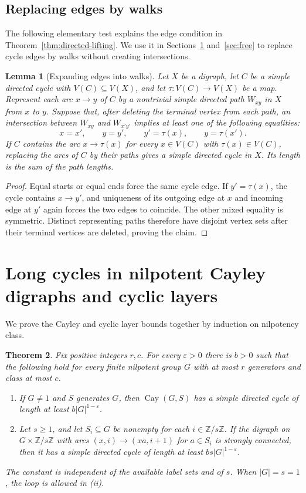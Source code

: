 \documentclass[11pt,a4paper,reqno]{amsart}
\newtheorem{theorem}{Theorem}[section]
\newtheorem{lemma}[theorem]{Lemma}
\theoremstyle{definition}
\theoremstyle{remark}
\numberwithin{equation}{section}
\DeclareMathOperator{\Cay}{Cay}
\newcommand{\Z}{\mathbb Z}
\newcommand{\eps}{\varepsilon}
\begin{document}
\subsection{Replacing edges by walks}
The following elementary test explains the edge condition in Theorem~\ref{thm:directed-lifting}. We use it in Sections~\ref{sec:nilpotent} and~\ref{sec:free} to replace cycle edges by walks without creating intersections.
\begin{lemma}[Expanding edges into walks]\label{lem:walk-expansion}
Let $X$ be a digraph, let $C$ be a simple directed cycle with $V(C)\subseteq V(X)$, and let $\tau:V(C)\to V(X)$ be a map. Represent each arc $x\to y$ of $C$ by a nontrivial simple directed path $W_{xy}$ in $X$ from $x$ to $y$. Suppose that, after deleting the terminal vertex from each path, an intersection between $W_{xy}$ and $W_{x'y'}$ implies at least one of the following equalities:
\[
 x=x',\qquad y=y',\qquad y'=\tau(x),\qquad y=\tau(x').
\]
If $C$ contains the arc $x\to\tau(x)$ for every $x\in V(C)$ with $\tau(x)\in V(C)$, replacing the arcs of $C$ by their paths gives a simple directed cycle in $X$. Its length is the sum of the path lengths.
\end{lemma}
\begin{proof}
Equal starts or equal ends force the same cycle edge. If $y'=\tau(x)$, the cycle contains $x\to y'$, and uniqueness of its outgoing edge at $x$ and incoming edge at $y'$ again forces the two edges to coincide. The other mixed equality is symmetric. Distinct representing paths therefore have disjoint vertex sets after their terminal vertices are deleted, proving the claim.
\end{proof}


\section{Long cycles in nilpotent Cayley digraphs and cyclic layers}\label{sec:nilpotent}
We prove the Cayley and cyclic layer bounds together by induction on nilpotency class.

\begin{theorem}\label{thm:nilpotent}
Fix positive integers $r,c$. For every $\eps>0$ there is $b>0$ such that the following hold for every finite nilpotent group $G$ with at most $r$ generators and class at most $c$.
\begin{enumerate}
\item If $G\ne1$ and $S$ generates $G$, then $\Cay(G,S)$ has a simple directed cycle of length at least $b|G|^{1-\eps}$.
\item Let $s\ge1$, and let $S_i\subseteq G$ be nonempty for each $i\in\Z/s\Z$. If the digraph on $G\times\Z/s\Z$ with arcs $(x,i)\to(xa,i+1)$ for $a\in S_i$ is strongly connected, then it has a simple directed cycle of length at least $bs|G|^{1-\eps}$.
\end{enumerate}
The constant is independent of the available label sets and of $s$. When $|G|=s=1$, the loop is allowed in \textup{(ii)}.
\end{theorem}
\end{document}
